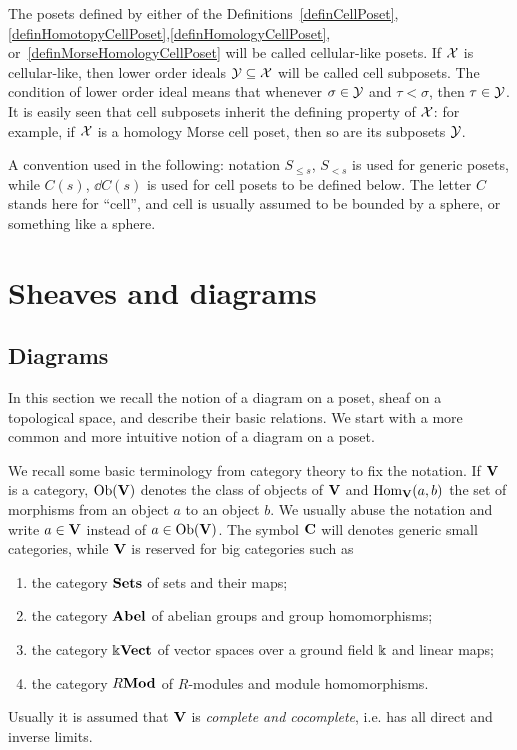 \begin{rem}\label{remSubposet}
The posets defined by either of the Definitions~\eqref{definCellPoset},\ref{definHomotopyCellPoset},\ref{definHomologyCellPoset}, or~\ref{definMorseHomologyCellPoset} will be called cellular-like posets. If $\mathcal{X}$ is cellular-like, then lower order ideals $\mathcal{Y}\subseteq\mathcal{X}$ will be called cell subposets. The condition of lower order ideal means that whenever $\sigma\in\mathcal{Y}$ and $\tau<\sigma$, then $\tau\in\mathcal{Y}$. It is easily seen that cell subposets inherit the defining property of $\mathcal{X}$: for example, if $\mathcal{X}$ is a homology Morse cell poset, then so are its subposets $\mathcal{Y}$.
\end{rem}

A convention used in the following: notation $S_{\leq s}$, $S_{<s}$ is used for generic posets, while $C(s)$, $\dd C(s)$ is used for cell posets to be defined below. The letter $C$ stands here for ``cell'', and cell is usually assumed to be bounded by a sphere, or something like a sphere.





\section{Sheaves and diagrams}\label{secMathSheaves}

\subsection{Diagrams} 

In this section we recall the notion of a diagram on a poset, sheaf on a topological space, and describe their basic relations. We start with a more common and more intuitive notion of a diagram on a poset.

We recall some basic terminology from category theory to fix the notation. If $\mathbf{V}$ is a category, $\operatorname{Ob}(\mathbf{V})$ denotes the class of objects of $\mathbf{V}$ and $\operatorname{Hom}_{\mathbf{V}}(a,b)$ the set of morphisms from an object $a$ to an object $b$. We usually abuse the notation and write $a\in\mathbf{V}$ instead of $a\in\operatorname{Ob}(\mathbf{V})$. The symbol $\mathbf{C}$ will denotes generic small categories, while $\mathbf{V}$ is reserved for big categories such as
\begin{enumerate}
  \item the category $\mathbf{Sets}$ of sets and their maps;
  \item the category $\mathbf{Abel}$ of abelian groups and group homomorphisms;
  \item the category $\Bbbk\mathbf{Vect}$ of vector spaces over a ground field $\Bbbk$ and linear maps;
  \item the category $R\mathbf{Mod}$ of $R$-modules and module homomorphisms.
\end{enumerate}
Usually it is assumed that $\mathbf{V}$ is \emph{complete and cocomplete}, i.e. has all direct and inverse limits.

